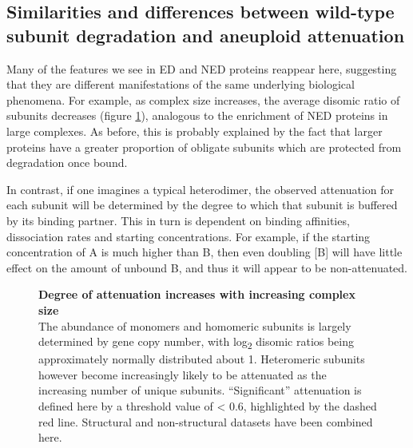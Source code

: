 \documentclass[a4paper,11pt,twoside,openright]{scrbook}
\begin{document}
\subsection{Similarities and differences between wild-type subunit degradation and aneuploid attenuation}

Many of the features we see in ED and NED proteins reappear here, suggesting that they are different manifestations of the same underlying biological phenomena. For example, as complex size increases, the average disomic ratio of subunits decreases (figure \ref{figure:aneuploidusubs}), analogous to the enrichment of NED proteins in large complexes. As before, this is probably explained by the fact that larger proteins have a greater proportion of obligate subunits which are protected from degradation once bound.


In contrast, if one imagines a typical heterodimer, the observed attenuation for each subunit will be determined by the degree to which that subunit is buffered by its binding partner. This in turn is dependent on binding affinities, dissociation rates and starting concentrations. For example, if the starting concentration of A is much higher than B, then even doubling [B] will have little effect on the amount of unbound B, and thus it will appear to be non-attenuated.

\begin{figure}[h]
    \caption[Degree of attenuation increases with increasing complex size]{\sffamily \textbf{Degree of attenuation increases with increasing complex size} \\ \small The abundance of monomers and homomeric subunits is largely determined by gene copy number, with log\textsubscript{2} disomic ratios being approximately normally distributed about 1. Heteromeric subunits however become increasingly likely to be attenuated as the increasing number of unique subunits. “Significant” attenuation is defined here by a threshold value of < 0.6, highlighted by the dashed red line. Structural and non-structural datasets have been combined here.}
    \label{figure:aneuploidusubs}
\end{figure}
\end{document}

